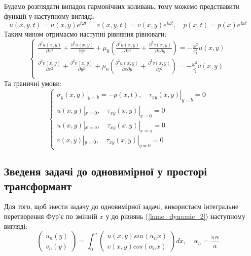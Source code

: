 Будемо розглядати випадок гармонічних коливань, тому можемо предствавити функції у наступному вигляді:
\begin{equation}
    u(x,y,t) = u(x,y) e^{i \omega t}, \quad v(x,y,t) = v(x,y) e^{i \omega t}, \quad p(x,t) = p(x) e^{i \omega t}
\end{equation}
Таким чином отримаємо наступні рівняння рівноваги:
\begin{equation}\label{lame_dynamic_2}
    \begin{cases}
        \frac{\partial^2 u(x,y)}{\partial x^2} + \frac{\partial^2 u(x,y)}{\partial y^2} + \mu_0 (\frac{\partial^2 u(x,y)}{\partial x^2} + \frac{\partial^2 v(x,y)}{\partial x\partial y}) = -\frac{\omega^2}{c_1^2}  u(x,y) \\
        \frac{\partial^2 v(x,y)}{\partial x^2} + \frac{\partial^2 v(x,y)}{\partial y^2} + \mu_0 (\frac{\partial^2 u(x,y)}{\partial x \partial y} + \frac{\partial^2 v(x,y)}{\partial y^2}) = -\frac{\omega^2}{c_2^2} v(x,y) \\
    \end{cases}
\end{equation}
Та граничні умови:
\begin{equation}\label{bound_dynamic_2}
    \begin{cases}
        \sigma_y(x, y) |_{y=b} = -p(x, t), \quad  \tau_{xy}(x,y) |_{y=b} =0 \\
        u(x,y) |_{x=0}, \quad \tau_{xy}(x,y) |_{x=0} =0 \\
        u(x,y) |_{x=a}, \quad \tau_{xy}(x,y) |_{x=a} =0 \\
        v(x,y) |_{y=0}, \quad \tau_{xy}(x,y) |_{y=0} =0
    \end{cases}
\end{equation}

\subsection{Зведеня задачі до одновимірної у просторі трансформант}
Для того, щоб звести задачу до одновимірної задачі, використаєм інтегральне перетворення Фур'є по змінній $x$ у до рівнянь (\ref{lame_dynamic_2}) наступному вигляді:
\begin{equation}
    \begin{pmatrix}
        u_n(y) \\
        v_n(y)
    \end{pmatrix} = \int_{0}^{a} 
    \begin{pmatrix}
        u(x,y) sin(\alpha_n x) \\
        v(x,y) cos(\alpha_n x)
    \end{pmatrix} dx, \quad \alpha_n = \frac{\pi n}{a}
\end{equation}

